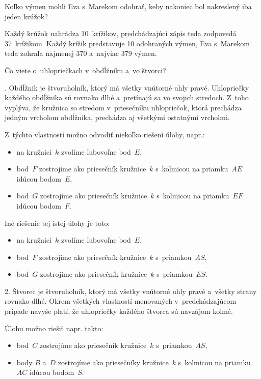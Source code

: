 {%
\napad
Koľko výmen mohli Eva s~Marekom odohrať, keby nakoniec bol nakreslený
iba jeden krúžok?

\riesenie
Každý krúžok nahrádza 10~krížikov, predchádzajúci zápis teda zodpovedá 37~krížikom.
Každý krížik predstavuje 10 odohraných výmen, Eva s~Marekom teda zohrala najmenej 370 a~najviac 379 výmen.
}

{%
\napad
Čo viete o~uhlopriečkach v~obdĺžniku a~vo štvorci?

.
Obdĺžnik je štvoruholník, ktorý má všetky vnútorné uhly pravé.
Uhlopriečky každého obdĺžnika sú rovnako dlhé a~pretínajú sa vo svojich stredoch.
Z~toho vyplýva, že kružnica so stredom v~priesečníku uhlopriečok, ktorá prechádza jedným vrcholom obdĺžnika, prechádza aj všetkými ostatnými vrcholmi.

Z~týchto vlastností možno odvodiť niekoľko riešení úlohy, napr.:
\begin{itemize}
\item na kružnici~$k$ zvolíme ľubovoľne bod~$E$,
\item bod~$F$ zostrojíme ako priesečník kružnice~$k$ s~kolmicou na priamku~$AE$ idúcou bodom~$E$,
\item bod~$G$ zostrojíme ako priesečník kružnice~$k$ s~kolmicou na priamku~$EF$ idúcou bodom~$F$.
\end{itemize}
Iné riešenie tej istej úlohy je toto:
\begin{itemize}
\item na kružnici~$k$ zvolíme ľubovoľne bod~$E$,
\item bod~$F$ zostrojíme ako priesečník kružnice~$k$ s~priamkou~$AS$,
\item bod~$G$ zostrojíme ako priesečník kružnice~$k$ s~priamkou~$ES$.%
\end{itemize}



2.
Štvorec je štvoruholník, ktorý má všetky vnútorné uhly pravé a~všetky strany rovnako dlhé.
Okrem všetkých vlastností menovaných v~predchádzajúcom prípade navyše platí, že uhlopriečky každého štvorca sú navzájom kolmé.

Úlohu možno riešiť napr. takto:
\begin{itemize}
\item bod~$C$ zostrojíme ako priesečník kružnice~$k$ s~priamkou~$AS$,
\item body $B$ a~$D$ zostrojíme ako priesečníky kružnice~$k$ s~kolmicou na priamku~$AC$ idúcou bodom~$S$.%
\end{itemize}



}

